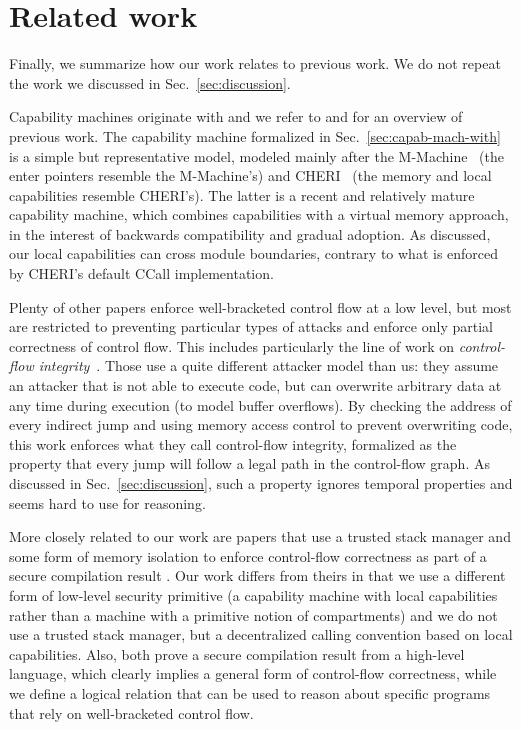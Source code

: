 \documentclass{llncs}
\newcommand{\sectionname}{Sec.}
\newcommand\lau[1]{{\color{purple} \sf \footnotesize {LS: #1}}\\}
\renewcommand\lau[1]{}
\begin{document}
\section{Related work}
\label{sec:related-work}

Finally, we summarize how our work relates to previous work. We do not
repeat the work we discussed in \sectionname~\ref{sec:discussion}.

Capability machines originate with \cite{Dennis:1966:PSM:365230.365252} and we refer to
\cite{Levy1984capability} and \cite{Watson2015Cheri} for an overview
of previous work. The capability machine formalized in
\sectionname~\ref{sec:capab-mach-with} is a simple but representative
model, modeled mainly after the
M-Machine~\cite{Carter:1994:HSF:195473.195579} (the enter pointers
resemble the M-Machine's) and
CHERI~\cite{Watson2015Cheri,Woodruff:2014:CCM:2665671.2665740} (the
memory and local capabilities resemble CHERI's). The latter is a
recent and relatively mature capability machine, which combines
capabilities with a virtual memory approach, in the interest of
backwards compatibility and gradual adoption. As discussed, our local
capabilities can cross module boundaries, 
contrary to what is enforced by CHERI's default CCall implementation.

Plenty of other papers\lau{If there are plenty, then I guess we should cite more
  than one?} enforce well-bracketed control flow at a low level, but most are
restricted to preventing particular types of attacks and enforce only partial
correctness of control flow. This includes particularly the line of work on
\emph{control-flow integrity}~\cite{abadi_control-flow_2005}. Those use a quite
different attacker model than us: they assume an attacker that is not able to
execute code, but can overwrite arbitrary data at any time during execution (to
model buffer overflows). By checking the address of every indirect jump and
using memory access control to prevent overwriting code, this work enforces what
they call control-flow integrity, formalized as the property that every jump
will follow a legal path in the control-flow graph. As discussed in
\sectionname~\ref{sec:discussion}, such a property ignores temporal properties and
seems hard to use for reasoning.

More closely related to our work are papers that use a trusted stack manager and
some form of memory isolation to enforce control-flow correctness as part of a
secure compilation
result \cite{patrignani_modular_2016-1,juglaret_beyond_2016-1}. Our work
differs from theirs in that we use a different form of low-level security
primitive (a capability machine with local capabilities rather than a machine
with a primitive notion of compartments) and we do not use a trusted stack
manager, but a decentralized calling convention based on local
capabilities. Also, both prove a secure compilation result from a high-level
language, which clearly implies a general form of control-flow correctness,
while we define a logical relation that can be used to reason about
specific programs that rely on well-bracketed control flow.
\end{document}
